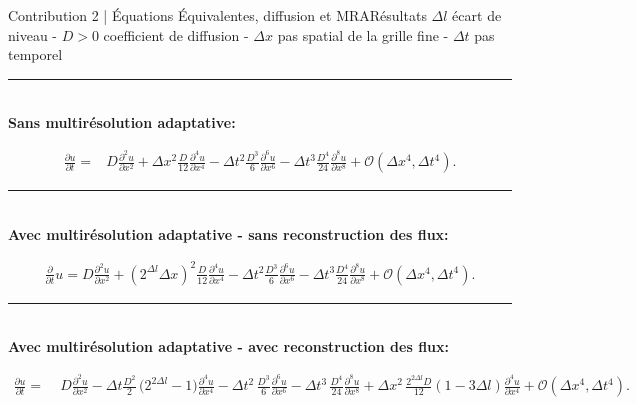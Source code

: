 
\begin{frame}{Contribution 2 | Équations Équivalentes, diffusion et MRA}{Résultats}
    \centering\scriptsize$\Delta l$ écart de niveau - $D>0$ coefficient de diffusion - $\Delta x$ pas spatial de la grille fine - $\Delta t$ pas temporel\\\normalsize
    \noindent\color{Primary}\rule{\linewidth}{0.6pt}\color{black}\\
    \textbf{Sans multirésolution adaptative: }\\
    \begin{center}\footnotesize
    \begin{align}
            \frac{\partial u}{\partial t}  =&D \frac{\partial^{2}u}{\partial x^{2}}
            + \Delta x^{2} \frac{D}{12}             \frac{\partial^{4}u}{\partial x^{4}} 
            -  \Delta t^{2} \frac{D^{3}}{6}          \frac{\partial^{6}u}{\partial x^{6}} 
            -  \Delta t^{3} \frac{D^{4}}{24}        \frac{\partial^{8}u}{\partial x^{8}}  + \mathcal{O}(\Delta x^4 , \Delta t^4).
    \end{align}
    \end{center}\pause
    \noindent\color{Primary}\rule{\linewidth}{0.6pt}\color{black}\\
    \textbf{Avec multirésolution adaptative - sans reconstruction des flux: }\\
        \begin{center}\footnotesize
        \begin{align}\label{eq:sansRecons:brute}
            \frac{\partial}{\partial t} u=
                D \frac{\partial^{2}u}{\partial x^{2}}
                + (2^{\Delta l} \Delta x)^{2}  \frac{D}{12} \frac{\partial^{4}u}{\partial x^{4}}
                -\Delta t^{2} \frac{D^{3}}{6}   \frac{\partial^{6}u}{\partial x^{6}}
                -\Delta t^{3} \frac{D^{4} }{24} \frac{\partial^{8}u}{\partial x^{8}}
                + \mathcal{O}(\Delta x^4 , \Delta t^4).
        \end{align}
        \end{center}\pause
    \noindent\color{Primary}\rule{\linewidth}{0.6pt}\color{black}\\
    \textbf{Avec multirésolution adaptative - avec reconstruction des flux: }\\
        \begin{center}\scriptsize
        \begin{align}\label{eq:equiv_brute_recons}
            \frac{\partial u}{\partial t} =&\; D \frac{\partial^2 u}{\partial x^2} 
            - \Delta t \frac{D^2}{2} \, \bigl( 2^{2\Delta l}- 1 \bigr)          \frac{\partial^4 u}{\partial x^4}
            - \Delta t^2\, \frac{D^3}{6}          \frac{\partial^6 u}{\partial x^6}
            - \Delta t^3\, \frac{D^4}{24}         \frac{\partial^8 u}{\partial x^8} 
            + \Delta x^2\, \frac{2^{2\Delta l}D}{12}  (1 - 3 \Delta l)  \frac{\partial^4 u}{\partial x^4}
            + \mathcal{O}(\Delta x^4 , \Delta t^4).
        \end{align}
    \end{center}

\end{frame}